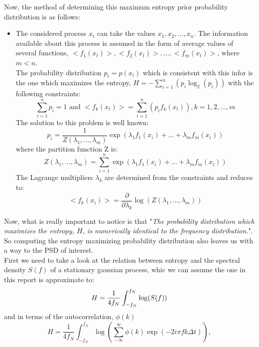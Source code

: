 \documentclass[11pt]{article}
\begin{document}
Now, the method of determining this maximum entropy prior probability distribution is as follows: \\
\begin{itemize}
	\item The considered process $x_t$ can take the values $x_1, x_2,..., x_n$. The information available about this process is assumed in the form of average values of several functions, $<f_1(x_t)>, <f_2(x_t)>,...,<f_m(x_t)>$, where $m<n$.\\
	The probability distribution $p_i = p(x_i)$ which is consistent with this infor is the one which maximizes the entropy, $H = -\sum_{i=1}^{n}(p_i \log_2(p_i))$ with the following constraints:
	\begin{equation}
		\sum_{i=1}^{n} p_i = 1 \text{ and } <f_k(x_t)> = \sum_{i=1}^{n}(p_i f_k(x_t)), k = 1,2,...,m
	\end{equation}
	The solution to this problem is well known:
	\begin{equation}
		p_i = \frac{1}{Z(\lambda_1,...,\lambda_m)}\exp(\lambda_1 f_1(x_i) + ... + \lambda_m f_m(x_i))
	\end{equation}
	where the partition function Z is:
	\begin{equation}
		Z(\lambda_1,...,\lambda_m) = \sum_{i = 1}^{n}\exp(\lambda_1 f_1(x_i) + ... + \lambda_m f_m(x_i))
	\end{equation}
	The Lagrange multipliers  $\lambda_k$ are determined from the constraints and reduces to:
	\begin{equation}
		<f_k(x_i)> = \frac{\partial}{\partial \lambda_k}\log(Z(\lambda_1,...,\lambda_m))
	\end{equation}
\end{itemize}
Now, what is really important to notice is that "\textit{The probability distribution which maximizes the entropy, $H$, is numerically identical to the frequency distribution.}"\cite{Jaynes}. So computing the entropy maximizing probability distribution also leaves us with a way to the PSD of interest.\\
First we need to take a look at the relation between entropy and the spectral density $S(f)$ of a stationary gaussian process, whic we can assume the one in this report is approximate to:
\begin{equation}
	H = \frac{1}{4 f_N} \int_{-f_N}^{f_N} \log(S(f))\\
\end{equation}
and in terms of the autocorrelation, $\phi(k)$
\begin{equation}
	H = \frac{1}{4 f_N} \int_{-f_N}^{f_N} \log(\sum_{-\infty}^{\infty}\phi(k)\exp(-2i\pi f k \Delta t)),
\end{equation}
\end{document}
